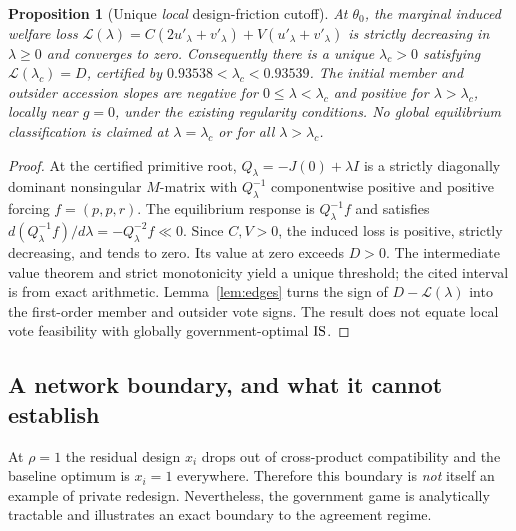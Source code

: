 \documentclass[11pt,a4paper]{article}
\newtheorem{proposition}[theorem]{Proposition}
\theoremstyle{remark}\newtheorem{remark}[theorem]{Remark}
\newcommand{\loss}{\mathcal L}\newcommand{\vect}[1]{\boldsymbol{#1}}
\begin{document}
\begin{proposition}[Unique \emph{local} design-friction cutoff]\label{prop:lambda}
At $\theta_0$, the marginal induced welfare loss $\loss(\lambda)=C(2u'_\lambda+v'_\lambda)+V(u'_\lambda+v'_\lambda)$ is strictly decreasing in $\lambda\ge0$ and converges to zero. Consequently there is a unique $\lambda_c>0$ satisfying $\loss(\lambda_c)=D$, certified by $0.93538<\lambda_c<0.93539$. The initial member and outsider accession slopes are negative for $0\le\lambda<\lambda_c$ and positive for $\lambda>\lambda_c$, locally near $g=0$, under the existing regularity conditions. No global equilibrium classification is claimed at $\lambda=\lambda_c$ or for all $\lambda>\lambda_c$.
\end{proposition}
\begin{proof}
At the certified primitive root, $Q_\lambda=-J(0)+\lambda I$ is a strictly diagonally dominant nonsingular $M$-matrix with $Q_\lambda^{-1}$ componentwise positive and positive forcing $f=(p,p,r)$. The equilibrium response is $Q_\lambda^{-1}f$ and satisfies $d(Q_\lambda^{-1}f)/d\lambda=-Q_\lambda^{-2}f\ll0$. Since $C,V>0$, the induced loss is positive, strictly decreasing, and tends to zero. Its value at zero exceeds $D>0$. The intermediate value theorem and strict monotonicity yield a unique threshold; the cited interval is from exact arithmetic. Lemma~\ref{lem:edges} turns the sign of $D-\loss(\lambda)$ into the first-order member and outsider vote signs. The result does not equate local vote feasibility with globally government-optimal $\mathrm{IS}$.
\end{proof}

\subsection{A network boundary, and what it cannot establish}
At $\rho=1$ the residual design $x_i$ drops out of cross-product compatibility and the baseline optimum is $x_i=1$ everywhere. Therefore this boundary is \emph{not} itself an example of private redesign. Nevertheless, the government game is analytically tractable and illustrates an exact boundary to the agreement regime.
\end{document}
